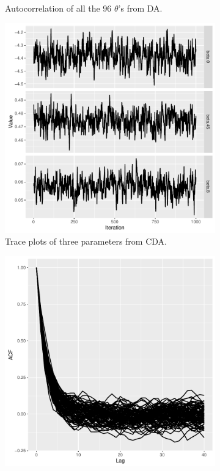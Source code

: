 \documentclass[10pt]{article}
\begin{document}
\begin{figure}[H]
\begin{subfigure}[b]{0.45\textwidth}
 \caption{Autocorrelation of all the 96 $\theta$'s from DA.}
   \label{acf_poi_da}
 \end{subfigure} 
  \begin{subfigure}[b]{0.45\textwidth}
 \includegraphics[width=1\textwidth]{traceplot_poisson_cda}
 \caption{Trace plots of three parameters from CDA.}
  \label{traceplot_poi_ada}
 \end{subfigure}
  \hfill 
 \begin{subfigure}[b]{0.45\textwidth}
 \includegraphics[width=1\textwidth]{poisson_cda_acf.pdf}

\end{subfigure}
\end{figure}
\end{document}
